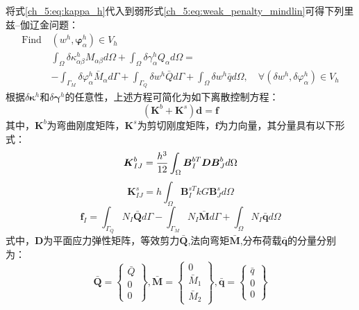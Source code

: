 将式\eqref{ch_5:eq:kappa_h}代入到弱形式\eqref{ch_5:eq:weak_penalty_mindlin}可得下列里兹--伽辽金问题：
\begin{equation}\label{ch_5:eq:ritz_penalty_mindlin}
    \begin{split} 
        \text{Find}\,&(w^h,\boldsymbol{\varphi}^h_{\alpha})\in V_h\\
        &\int_{\Omega}\delta\kappa^h_{\alpha\beta}M_{\alpha\beta}d\Omega+\int_{\Omega}\delta\gamma^h_{\alpha}Q_{\alpha}d\Omega=\\
        &-\int_{\Gamma_{M}}\delta\varphi^h_{\alpha}{\bar{M}_{\alpha}}d\Gamma+\int_{\Gamma_{Q}}{\delta{w^h}}\bar {Q}d\Gamma+\int_{\Omega} \delta{w^h}\bar{q}d\Omega,\quad \forall(\delta w^h,\delta\varphi^h_{\alpha}) \in V_h
    \end{split}
\end{equation}
根据$\delta\boldsymbol\kappa^h$和$\delta\boldsymbol\gamma^h$的任意性，上述方程可简化为如下离散控制方程：
\begin{equation}\label{ch_5:eq:equilibrium_penalty}
    (\boldsymbol K^b + \boldsymbol K^s) \boldsymbol d = \boldsymbol f
\end{equation}
其中，$\boldsymbol K^b$为弯曲刚度矩阵，$\boldsymbol K^s$为剪切刚度矩阵，$\pmb{f}$为力向量，其分量具有以下形式：
\begin{equation}\label{ch_5:eq:stiffness_bending}
    \boldsymbol K^b_{IJ} = \frac{h^3}{12} \int_\Omega \boldsymbol B^{bT}_I \boldsymbol D \boldsymbol B^b_J d\Omega\\
\end{equation}
\begin{equation}\label{ch_5:eq:stiffness_shear}
    \boldsymbol K^s_{IJ} = h \int_\Omega \boldsymbol B^{sT}_I kG \boldsymbol B^s_J d\Omega
\end{equation}
\begin{equation}
    \boldsymbol f_I = \int_{\Gamma_Q} N_I \bar{\boldsymbol Q} d\Gamma - \int_{\Gamma_M} N_I \bar{\boldsymbol M} d\Gamma + \int_\Omega N_I \bar{\boldsymbol q} d\Omega
\end{equation}
式中，$\boldsymbol{D}$为平面应力弹性矩阵，等效剪力$\bar{\boldsymbol Q}$,法向弯矩$\bar{\boldsymbol M}$,分布荷载$\bar{\boldsymbol q}$的分量分别为：
\begin{equation}
    \bar{\boldsymbol Q} =  
    \begin{Bmatrix}
        \bar Q \\ 0 \\ 0
    \end{Bmatrix},
        \bar{\boldsymbol M} =
    \begin{Bmatrix}
        0 \\ \bar M_1 \\ \bar M_2
    \end{Bmatrix},
        \bar{\boldsymbol q} =
    \begin{Bmatrix}
        \bar q \\ 0 \\ 0
    \end{Bmatrix}
\end{equation}

